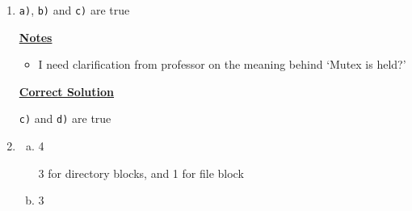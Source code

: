 \documentclass[12pt]{article}
\begin{document}
\begin{enumerate}[1.]
\begin{enumerate}[a)]
\begin{itemize}


        \end{itemize}


    \end{enumerate}

    \bigskip

    \item

    \texttt{a)}, \texttt{b)} and \texttt{c)} are true

    \bigskip

    \underline{\textbf{Notes}}

    \begin{itemize}
        \item I need clarification from professor on the meaning behind `Mutex is held?'
    \end{itemize}

    \bigskip

    \begin{mdframed}
    \underline{\textbf{Correct Solution}}

    \bigskip

    \color{red}\texttt{c)} and \texttt{d)}\color{black} are true
    \end{mdframed}

    \item

    \bigskip

    \begin{enumerate}[a)]
        \item 4

        \bigskip

        3 for directory blocks, and 1 for file block

        \item 3

        \bigskip


\end{enumerate}
\end{enumerate}
\end{document}
